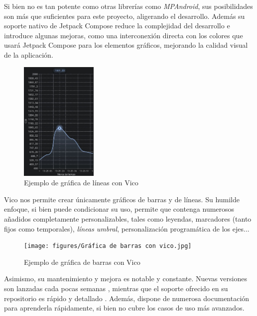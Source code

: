             Si bien no es tan potente como otras librerías como \textit{MPAndroid}, sus posibilidades son más que 
            suficientes para este proyecto, aligerando el desarrollo. Además su soporte nativo de Jetpack
            Compose reduce la complejidad del desarrollo e introduce algunas mejoras, como una interconexión
            directa con los colores que usará Jetpack Compose para los elementos gráficos, mejorando la calidad visual
            de la aplicación.

            \begin{figure}[h]
                \centering
                \includegraphics[width=0.33\textwidth]{figures/Gráfica de líneas con vico.jpg}
                \caption{Ejemplo de gráfica de líneas con Vico}
                \label{figure:vico:ejemplo_lineas}
            \end{figure}

            Vico nos permite crear únicamente gráficos de barras y de líneas. Su humilde enfoque, si bien puede
            condicionar su uso, permite que contenga numerosos añadidos completamente personalizables, tales como
            leyendas, marcadores (tanto fijos como temporales), \textit{líneas umbral}, personalización programática 
            de los ejes...

            \begin{figure}[h]
                \centering
                \texttt{[image: figures/Gráfica de barras con vico.jpg]}
                \caption{Ejemplo de gráfica de barras con Vico}
                \label{figure:vico:ejemplo_barras}
            \end{figure}
            
            Asimismo, su mantenimiento y mejora es notable y constante. Nuevas versiones son lanzadas
            cada pocas semanas \cite{goworowski_vico_2023-1}, mientras que el soporte ofrecido en su repositorio 
            es rápido y detallado \cite{goworowski_vico_2023}. Además, dispone de numerosa documentación para
            aprenderla rápidamente, si bien no cubre los casos de uso más avanzados.

